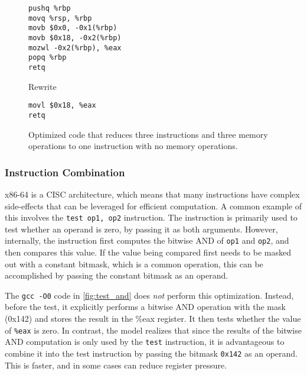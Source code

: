 \documentclass{article}
\begin{document}

\begin{figure}
\begin{lstlisting}
pushq %rbp
movq %rsp, %rbp
movb $0x0, -0x1(%rbp)
movb $0x18, -0x2(%rbp)
mozwl -0x2(%rbp), %eax
popq %rbp
retq
\end{lstlisting}
Rewrite
\begin{lstlisting}
movl $0x18, %eax
retq
\end{lstlisting}
    \centering
    \caption{Optimized code that reduces three instructions and three memory operations to one instruction with no memory operations.}
    \label{fig:bitvector}
\end{figure}

\subsubsection{Instruction Combination}

x86-64 is a CISC architecture, which means that many instructions have complex side-effects that can be leveraged for efficient computation.  
%
A common example of this involves the \texttt{test op1, op2} instruction.  The instruction is primarily used to  test whether an operand is zero, by passing it as both arguments.  However, internally, the instruction first computes the bitwise AND of \texttt{op1} and \texttt{op2}, and then compares this value.   %
If the value being compared first needs to be masked out with a constant bitmask, which is a common operation, this can be accomplished by passing the constant bitmask as an operand.




The \texttt{gcc -O0} code in \cref{fig:test_and} does \emph{not} perform this optimization.  Instead, before the test, it explicitly performs a bitwise AND operation with the mask (0x142) and stores the result in the \%eax register.  It then tests whether the value of \texttt{\%eax} is zero.  In contrast, the model realizes that since the results of the bitwise AND computation is only used by the \texttt{test} instruction, it is advantageous to combine it into the test instruction by passing the bitmask \texttt{0x142} as an operand.  This is faster, and in some cases can reduce register pressure.
\end{document}
